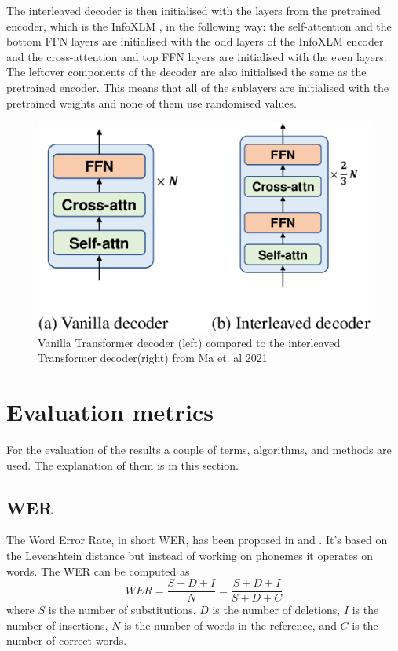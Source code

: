 The interleaved decoder is then initialised with the layers from the pretrained encoder, which is the InfoXLM \cite{chi2021infoxlminformationtheoreticframeworkcrosslingual}, in the following way: the self-attention and the bottom FFN layers are initialised with the odd layers of the InfoXLM encoder and the cross-attention and top FFN layers are initialised with the even layers. 
The leftover components of the decoder are also initialised the same as the pretrained encoder. 
This means that all of the sublayers are initialised with the pretrained weights and none of them use randomised values. 

\begin{figure}
    \centering%
    \includegraphics[width=0.5\linewidth]{Latex/sections/images/interleaveddecoder.png}
    \caption{Vanilla Transformer decoder (left) compared to the interleaved Transformer decoder(right) from Ma et. al 2021}
    \label{fig:interleaved decoder}
\end{figure}



\section{Evaluation metrics}
 For the evaluation of the results a couple of terms, algorithms, and methods are used. The explanation of them is in this section. 
 
\subsection{WER}
\label{wer}
The Word Error Rate, in short WER, has been proposed in \cite{woodard1982} and \cite{morris2004}.
It's based on the Levenshtein distance \cite{Levenshtein1965BinaryCC} but instead of working on phonemes it operates on words.
The WER can be computed as $$WER=\frac{S+D+I}{N}=\frac{S+D+I}{S+D+C}$$ where $S$ is the number of substitutions, $D$ is the number of deletions, $I$ is the number of insertions, $N$ is the number of words in the reference, and $C$ is the number of correct words.

